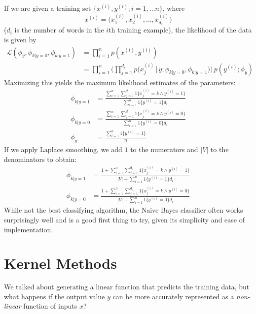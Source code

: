 \documentclass[a4paper, 12pt]{report}
\theoremstyle{remark}
\theoremstyle{definition}
\begin{document}
If we are given a training set $\{x^{(i)}, y^{(i)}; i = 1, \ldots n\}$, where 
\[x^{(i)} = \big( x_1^{(i)}, x_2^{(i)}, \ldots, x_{d_i}^{(i)}\big) \]
($d_i$ is the number of words in the $i$th training example), the likelihood of the data is given by 
\begin{align*}
    \mathcal{L}(\phi_y, \phi_{k|y=0}, \phi_{k|y=1}) & = \prod_{i=1}^n p(x^{(i)}, y^{(i)}) \\
    & = \prod_{i=1}^n \bigg( \prod_{j=1}^{d_i} p\big( x_j^{(i)} \,|\, y; \phi_{k|y=0}, \phi_{k|y=1} \big) \bigg) \, p(y^{(i)}; \phi_y)
\end{align*}
Maximizing this yields the maximum likelihood estimates of the parameters: 
\begin{align*}
    \phi_{k|y=1} & = \frac{\sum_{i=1}^n \sum_{j=1}^{d_i} 1\{x_j^{(i)} = k \wedge y^{(i)} = 1\}}{\sum_{i=1}^n 1\{y^{(i)} = 1\} d_i} \\
    \phi_{k|y=0} & = \frac{\sum_{i=1}^n \sum_{j=1}^{d_i} 1\{x_j^{(i)} = k \wedge y^{(i)} = 0\}}{\sum_{i=1}^n 1\{y^{(i)} = 0\} d_i} \\
    \phi_y & = \frac{\sum_{i=1}^n 1\{y^{(i)} = 1\}}{n} 
\end{align*}
If we apply Laplace smoothing, we add $1$ to the numerators and $|V|$ to the denominators to obtain: 
\begin{align*}
    \phi_{k|y=1} & = \frac{1 + \sum_{i=1}^n \sum_{j=1}^{d_i} 1\{x_j^{(i)} = k \wedge y^{(i)} = 1\}}{|V| + \sum_{i=1}^n 1\{y^{(i)} = 1\} d_i} \\
    \phi_{k|y=0} & = \frac{1 + \sum_{i=1}^n \sum_{j=1}^{d_i} 1\{x_j^{(i)} = k \wedge y^{(i)} = 0\}}{|V| + \sum_{i=1}^n 1\{y^{(i)} = 0\} d_i}
\end{align*}
While not the best classifying algorithm, the Naive Bayes classifier often works surprisingly well and is a good first thing to try, given its simplicity and ease of implementation. 

\section{Kernel Methods}
We talked about generating a linear function that predicts the training data, but what happens if the output value $y$ can be more accurately represented as a \textit{non-linear} function of inputs $x$? 
\end{document}
